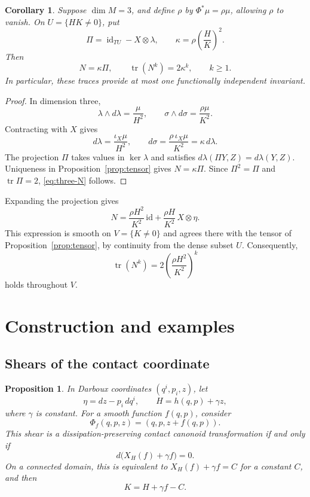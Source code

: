 \documentclass[11pt,a4paper]{article}
\numberwithin{equation}{section}
\newtheorem{proposition}{Proposition}
\newtheorem{corollary}{Corollary}
\theoremstyle{definition}
\theoremstyle{remark}
\newcommand{\id}{\operatorname{id}}
\newcommand{\tr}{\operatorname{tr}}
\begin{document}
\begin{corollary}
\label{cor:three}
Suppose $\dim M=3$, and define $\rho$ by
$\Phi^*\mu=\rho\mu$, allowing $\rho$ to vanish.
On $U=\{HK\neq0\}$, put
\[
\Pi=\id_{TU}-X\otimes\lambda,\qquad
\kappa=\rho\left(\frac HK\right)^2.
\]
Then
\begin{equation}
N=\kappa \Pi,\qquad
\tr(N^k)=2\kappa^k,\qquad k\geq1.
\label{eq:three-N}
\end{equation}
In particular, these traces provide at most one
functionally independent invariant.
\end{corollary}

\begin{proof}
In dimension three,
\[
\lambda\wedge d\lambda=\frac{\mu}{H^2},
\qquad
\sigma\wedge d\sigma=\frac{\rho\mu}{K^2}.
\]
Contracting with $X$ gives
\[
d\lambda=\frac{\iota_X\mu}{H^2},
\qquad
d\sigma=\frac{\rho\,\iota_X\mu}{K^2}
=\kappa\,d\lambda.
\]
The projection $\Pi$ takes values in $\ker\lambda$ and
satisfies $d\lambda(\Pi Y,Z)=d\lambda(Y,Z)$.
Uniqueness in Proposition~\ref{prop:tensor} gives
$N=\kappa \Pi$. Since $\Pi^2=\Pi$ and $\tr \Pi=2$,
\eqref{eq:three-N} follows.
\end{proof}

Expanding the projection gives
\[
N=\frac{\rho H^2}{K^2}\,\mathrm{id}
  +\frac{\rho H}{K^2}\,X\otimes\eta.
\]
This expression is smooth on $V=\{K\neq0\}$ and agrees
there with the tensor of Proposition~\ref{prop:tensor}, by continuity
from the dense subset $U$. Consequently,
\[
\operatorname{tr}(N^k)
=2\left(\frac{\rho H^2}{K^2}\right)^k
\]
holds throughout $V$.





\section{Construction and examples}
\label{sec:examples}

\subsection{Shears of the contact coordinate}

\begin{proposition}
\label{prop:shear}
In Darboux coordinates $(q^i,p_i,z)$, let
\[
\eta=dz-p_i\,dq^i,\qquad
H=h(q,p)+\gamma z,
\]
where $\gamma$ is constant. For a smooth function
$f(q,p)$, consider
\[
\Phi_f(q,p,z)=(q,p,z+f(q,p)).
\]
This shear is a dissipation-preserving contact canonoid
transformation if and only if
\begin{equation}
d\bigl(X_H(f)+\gamma f\bigr)=0.
\label{eq:shear-condition}
\end{equation}
On a connected domain, this is equivalent to
$X_H(f)+\gamma f=C$ for a constant $C$, and then
\begin{equation}
K=H+\gamma f-C.
\label{eq:shear-K}
\end{equation}
\end{proposition}
\end{document}
